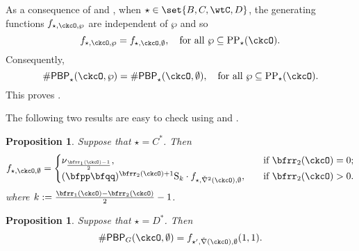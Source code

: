 \documentclass[12pt]{amsart}
\newcommand{\CO}{{\mathcal {O}}}
\newcommand{\RS}{{\mathrm {S}}}
\def\DD{\nabla}
\numberwithin{equation}{section}
\newtheorem{prop}[thm]{Proposition}
\theoremstyle{remark}
\def\DD{\nabla}
\def\CPPs{\mathrm{PP}_{\star}}
\def\PBP{\mathsf{PBP}}
\def\PBPop#1#2#3#4{\PBP_{#1}^{#2}(#3,#4)}
\newcommand{\PBPOP}[1][]{\PBPop{\star}{#1}{\ckcO}{\wp}}
\def\yrow#1{\left[#1\right]_{\mathrm{row}}}
\def\ckDD{{\check\DD}}
\def\DD{\nabla}
\begin{document}
As a consequence of  and ,
when $\star \in \set{B,C,\wtC, D}$, the generating functions $f_{\star,\ckcO,\wp}$ are independent of $\wp$ and so
  \[
    f_{\star,\ckcO,\wp} = f_{\star,\ckcO,\emptyset}, \quad \text{for all $\wp\subseteq \CPPs(\ckcO)$.}
  \]
Consequently,
\[
    \# \PBPOP = \# \PBPop{\star}{}{\ckcO}{\emptyset}, \quad \text{for all $\wp\subseteq  \CPPs(\ckcO)$.}
\]
This proves .


The following two results are easy to check using  and .

\begin{prop}\label{lem:gf.C*}
  Suppose that $\star = C^{*}$. Then
  \[
      f_{\star, \ckcO,\emptyset} =
     \begin{cases}
     \nu_{\frac{\bfrr_1(\ckcO)-1}{2}}, &\quad \text{if }\bfrr_2(\ckcO) = 0;  \\
     (\bfpp\bfqq)^{\bfrr_{2}(\ckcO)+1} \RS_{k}\cdot f_{\star,\ckDD^{2}(\ckcO),\emptyset},
     & \quad \text{if } \bfrr_2(\ckcO)>0. \\
     \end{cases}
  \]
  where $k := \frac{\bfrr_{1}(\ckcO)-\bfrr_{2}(\ckcO)}{2}-1$.
\end{prop}


\begin{prop}\label{lem:gf.D*}
  Suppose that $\star = D^{*}$. Then
  \[
    \# \PBP_G(\ckcO,\emptyset) = f_{\star',\ckDD(\ckcO),\emptyset}(1,1).
  \]
  \end{prop}
\end{document}
